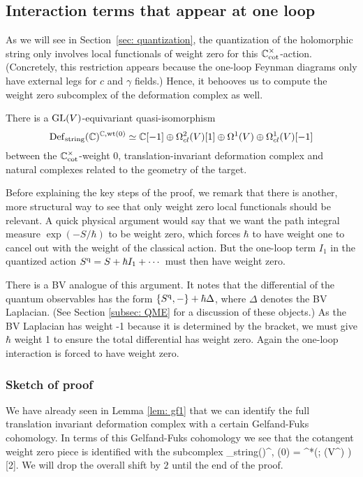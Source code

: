 \subsection{Interaction terms that appear at one loop}

As we will see in Section~\ref{sec: quantization}, 
the quantization of the holomorphic string only involves local functionals of weight zero for this $\mathbb C^\times_{\rm cot}$-action.
(Concretely, this restriction appears because the one-loop Feynman diagrams only have external legs for $c$ and $\gamma$ fields.)
Hence, it behooves us to compute the weight zero subcomplex of the deformation complex as well.

\begin{lem}
\label{lem: def complex wt zero} 
There is a ${\rm GL}(V)$-equivariant quasi-isomorphism
\[
{\rm Def}_{\rm string}(\mathbb C)^{\mathbb C, {\rm wt}(0)} \simeq \mathbb C[-1] \oplus \Omega^2_{cl}(V)[1] \oplus \Omega^1(V) \oplus \Omega^1_{cl}(V)[-1] 
\]
between the $\mathbb C^\times_{\rm cot}$-weight $0$, translation-invariant deformation complex 
and natural complexes related to the geometry of the target.
\end{lem}

Before explaining the key steps of the proof, 
we remark that there is another, more structural way to see that only weight zero local functionals should be relevant.
A quick physical argument would say that we want the path integral measure $\exp(-S/\hbar)$ to be weight zero,
which forces $\hbar$ to have weight one to cancel out with the weight of the classical action.
But the one-loop term $I_1$ in the quantized action $S^{\rm q} = S + \hbar I_1 + \cdots$ must then have weight zero.

There is a BV analogue of this argument.
It notes that the differential of the quantum observables has the form $\{S^{\rm q},-\} + \hbar \Delta$,
where $\Delta$ denotes the BV Laplacian.
(See Section \ref{subsec: QME} for a discussion of these objects.)
As the BV Laplacian has weight -1 because it is determined by the bracket,
we must give $\hbar$ weight 1 to ensure the total differential has weight zero.
Again the one-loop interaction is forced to have weight zero.

\subsubsection{Sketch of proof}

We have already seen in Lemma \ref{lem: gf1} that we can identify the full translation invariant deformation complex with a certain Gelfand-Fuks cohomology. 
In terms of this Gelfand-Fuks cohomology we see that the cotangent weight zero piece is identified with the subcomplex
\ben
\Def_{\rm string}(\CC)^{\CC, \wt(0)} = \cred^*\left(\wone ; \Sym(V^\vee[z^\vee]) \right) [2]. 
\een 
We will drop the overall shift by $2$ until the end of the proof. 

